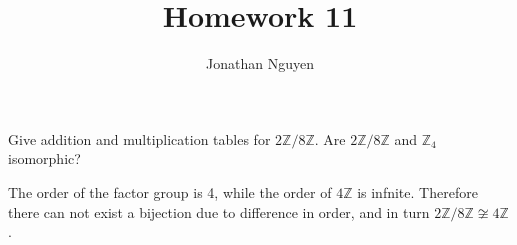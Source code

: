 \documentclass[11pt]{article}
\title{Homework 11}
\author{Jonathan Nguyen}
\begin{document}
\begin{problem}[26.4]
    Give addition and multiplication tables for $2\mathbb{Z}/8\mathbb{Z}$. Are $2\mathbb{Z}/8\mathbb{Z}$ and $\mathbb{Z}_4$ isomorphic?
\end{problem}
\begin{solution}
    The order of the factor group is 4, while the order of $4\mathbb{Z}$ is infnite. Therefore there can not exist a bijection due to difference in order, and in turn $2\mathbb{Z}/8\mathbb{Z} \not\cong 4\mathbb{Z}$.
\end{solution}
\begin{problem}
    
\end{problem}
\end{document}
